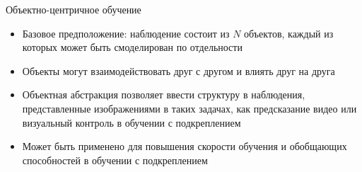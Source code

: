 \begin{frame}{Объектно-центричное обучение}
    \begin{itemize}
        \item<1-4> Базовое предположение: наблюдение состоит из $N$ объектов, каждый из которых может быть смоделирован по отдельности
        \item<2-4> Объекты могут взаимодействовать друг с другом и влиять друг на друга
        \item<3-4> Объектная абстракция позволяет ввести структуру в наблюдения, представленные изображениями в таких задачах, как предсказание видео или визуальный контроль в обучении с подкреплением
        \item<4> Может быть применено для повышения скорости обучения и обобщающих способностей в обучении с подкреплением
    \end{itemize}
    
\end{frame}



